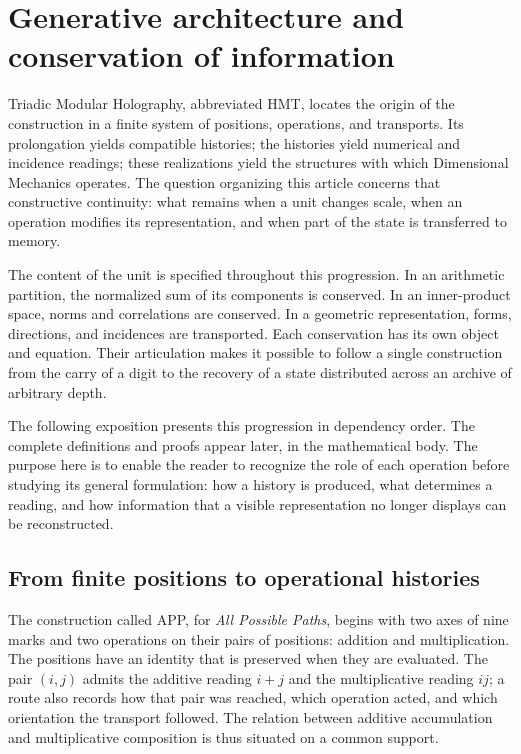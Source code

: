 \section*{Generative architecture and conservation of information}
\label{libnar:troncal}

Triadic Modular Holography, abbreviated HMT, locates the origin of the
construction in a finite system of positions, operations, and transports.
Its prolongation yields compatible histories; the histories yield
numerical and incidence readings; these realizations yield the structures
with which Dimensional Mechanics operates. The question organizing this
article concerns that constructive continuity: what remains when a
unit changes scale, when an operation modifies its representation,
and when part of the state is transferred to memory.

The content of the unit is specified throughout this progression. In an
arithmetic partition, the normalized sum of its components is conserved.
In an inner-product space, norms and correlations are conserved.
In a geometric representation, forms, directions, and incidences
are transported. Each conservation has its own object and equation.
Their articulation makes it possible to follow a single construction from the carry
of a digit to the recovery of a state distributed across an archive
of arbitrary depth.

The following exposition presents this progression in dependency order.
The complete definitions and proofs appear later, in the
mathematical body. The purpose here is to enable the reader to recognize
the role of each operation before studying its general formulation: how a
history is produced, what determines a reading, and how information
that a visible representation no longer displays can be reconstructed.

\subsection*{From finite positions to operational histories}
\label{libnar:app}

The construction called APP, for \emph{All Possible Paths}, begins with
two axes of nine marks and two operations on their pairs of
positions: addition and multiplication. The positions have an identity that is
preserved when they are evaluated. The pair \((i,j)\) admits the additive reading
\(i+j\) and the multiplicative reading \(ij\); a route also records how that
pair was reached, which operation acted, and which orientation the
transport followed. The relation between additive accumulation and
multiplicative composition is thus situated on a common support.

